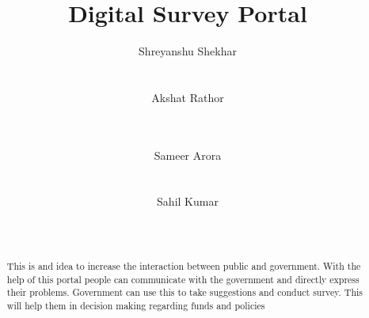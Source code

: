 \documentclass{sig-alternate}
\begin{document}
%




\title{Digital Survey Portal}


%
\author{
\alignauthor Shreyanshu Shekhar\\
       \\
       \\
\alignauthor Akshat Rathor\\
       \\
       \\
\and  
\alignauthor Sameer Arora\\
       \\
       \\
\alignauthor Sahil Kumar\\
       \\
       \\
}




\maketitle
\begin{abstract}
This is and idea to increase the interaction between
public and government. With the help of this portal people can
communicate with the government and directly express their
problems. Government can use this to take suggestions and
conduct survey. This will help them in decision making regarding
funds and policies
\end{abstract}
\end{document}

